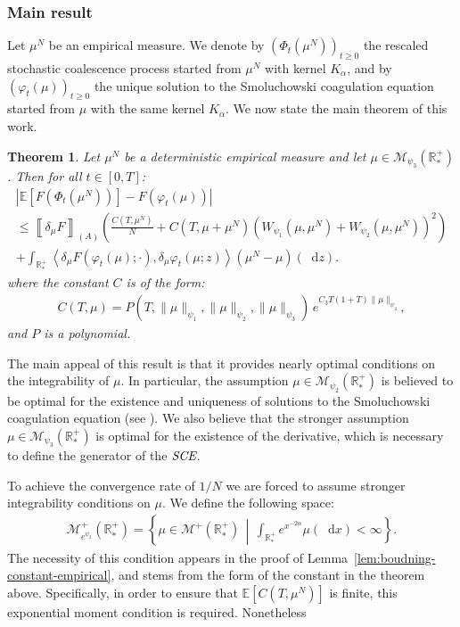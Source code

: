 \documentclass[11pt,a4paper]{article}
\newcommand{\RRP}{\mathbb{R}^+_*}
\newcommand{\MC}{\mathcal{M}}
\newcommand{\SCE}{\emph{SCE}}
\newcommand{\A}{(A)}
\newcommand{\Proc}[1]{\left(#1\right)_{t\geq 0}}
\newcommand{\dd}{\mathop{}\!\mathrm{d}}
\newtheorem{theorem}{Theorem}[section]
\begin{document}
\subsubsection*{Main result}

Let $\mu^N$ be an empirical measure. We denote by \(\Proc{\Phi_t(\mu^N)}\) the rescaled stochastic coalescence process started from \(\mu^N\) with kernel \(K_\alpha\), and by \(\Proc{\varphi_t(\mu)}\) the unique solution to the Smoluchowski coagulation equation started from \(\mu\) with the same kernel \(K_\alpha\). We now state the main theorem of this work.

\begin{theorem}\label{thm:main-result}
    Let $\mu^N$ be a deterministic empirical measure and let $\mu \in \MC_{\psi_3}(\RRP)$. Then for all $t \in [0,T]$:
    \begin{multline*}
        \left| \mathbb{E}\left[F\left(\Phi_t\left(\mu^N\right)\right)\right] - F\left(\varphi_t(\mu)\right) \right| \\
        \leq \left\llbracket \delta_\mu F \right\rrbracket_{\A} \left( \frac{C(T,\mu^N)}{N} + C(T,\mu + \mu^N)\left(W_{\psi_1}\left(\mu,\mu^N\right) + W_{\psi_2}\left(\mu,\mu^N\right) \right)^2\right) \\
        + \int_{\RRP} \left\langle \delta_\mu F\left(\varphi_t \left(\mu\right);\cdot \right), \delta_\mu \varphi_t\left(\mu;z \right) \right\rangle \left(\mu^N - \mu\right)(\dd z).
    \end{multline*}
    where the constant $C$ is of the form:
    \begin{align*}
        C(T,\mu) = P(T,\|\mu\|_{\psi_1},\|\mu\|_{\psi_2},\|\mu\|_{\psi_3})\, e^{C_3 T(1 + T)\|\mu\|_{\psi_2}},
    \end{align*}
    and $P$ is a polynomial.
\end{theorem}

The main appeal of this result is that it provides nearly optimal conditions on the integrability of $\mu$. In particular, the assumption $\mu \in \MC_{\psi_2}(\RRP)$ is believed to be optimal for the existence and uniqueness of solutions to the Smoluchowski coagulation equation (see \cite{norris1999Smoluchowski}). We also believe that the stronger assumption $\mu \in \MC_{\psi_3}(\RRP)$ is optimal for the existence of the derivative, which is necessary to define the generator of the $\SCE$.

To achieve the convergence rate of $1/N$ we are forced to assume stronger integrability conditions on $\mu$. We define the following space:
\begin{align*}
    \MC^+_{e^{\psi_2}}(\RRP) = \left\lbrace \mu \in \MC^+(\RRP) \,\middle|\, \int_{\RRP} e^{x^{-2\alpha}} \mu(\dd x) < \infty \right\rbrace.
\end{align*}
The necessity of this condition appears in the proof of Lemma~\ref{lem:boudning-constant-empirical}, and stems from the form of the constant in the theorem above. Specifically, in order to ensure that $\mathbb{E}[C(T,\mu^N)]$ is finite, this exponential moment condition is required. Nonetheless 
\end{document}
